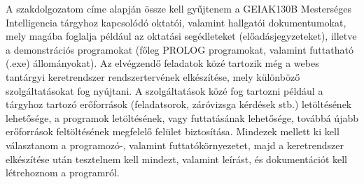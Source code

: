 
A szakdolgozatom címe alapján össze kell gyűjtenem a GEIAK130B Mesterséges Intelligencia tárgyhoz kapcsolódó oktatói, valamint hallgatói dokumentumokat, mely magába foglalja például az oktatási segédleteket (előadásjegyzeteket), illetve a demonstrációs programokat (főleg PROLOG programokat, valamint futtatható (.exe) állományokat). Az elvégzendő feladatok közé tartozik még a webes tantárgyi keretrendszer rendszertervének elkészítése, mely különböző szolgáltatásokat fog nyújtani. A szolgáltatások közé fog tartozni például a tárgyhoz tartozó erőforrások (feladatsorok, záróvizsga kérdések stb.) letöltésének lehetősége, a programok letöltésének, vagy futtatásának lehetősége, továbbá újabb erőforrások feltöltésének megfelelő felület biztosítása. Mindezek mellett ki kell választanom a programozó-, valamint futtatókörnyezetet, majd a keretrendszer elkészítése után tesztelnem kell mindezt, valamint leírást, és dokumentációt kell létrehoznom a programról.

